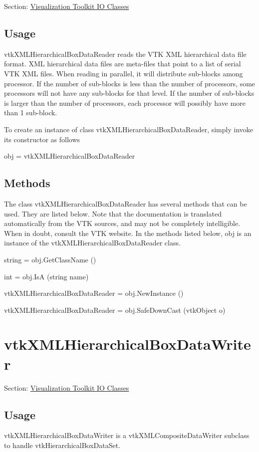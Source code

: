 Section\-: \hyperlink{sec_vtkio}{Visualization Toolkit I\-O Classes} \hypertarget{vtkwidgets_vtkxyplotwidget_Usage}{}\subsection{Usage}\label{vtkwidgets_vtkxyplotwidget_Usage}
vtk\-X\-M\-L\-Hierarchical\-Box\-Data\-Reader reads the V\-T\-K X\-M\-L hierarchical data file format. X\-M\-L hierarchical data files are meta-\/files that point to a list of serial V\-T\-K X\-M\-L files. When reading in parallel, it will distribute sub-\/blocks among processor. If the number of sub-\/blocks is less than the number of processors, some processors will not have any sub-\/blocks for that level. If the number of sub-\/blocks is larger than the number of processors, each processor will possibly have more than 1 sub-\/block.

To create an instance of class vtk\-X\-M\-L\-Hierarchical\-Box\-Data\-Reader, simply invoke its constructor as follows \begin{DoxyVerb}  obj = vtkXMLHierarchicalBoxDataReader
\end{DoxyVerb}
 \hypertarget{vtkwidgets_vtkxyplotwidget_Methods}{}\subsection{Methods}\label{vtkwidgets_vtkxyplotwidget_Methods}
The class vtk\-X\-M\-L\-Hierarchical\-Box\-Data\-Reader has several methods that can be used. They are listed below. Note that the documentation is translated automatically from the V\-T\-K sources, and may not be completely intelligible. When in doubt, consult the V\-T\-K website. In the methods listed below, {\ttfamily obj} is an instance of the vtk\-X\-M\-L\-Hierarchical\-Box\-Data\-Reader class. 
\begin{DoxyItemize}
\item {\ttfamily string = obj.\-Get\-Class\-Name ()}  
\item {\ttfamily int = obj.\-Is\-A (string name)}  
\item {\ttfamily vtk\-X\-M\-L\-Hierarchical\-Box\-Data\-Reader = obj.\-New\-Instance ()}  
\item {\ttfamily vtk\-X\-M\-L\-Hierarchical\-Box\-Data\-Reader = obj.\-Safe\-Down\-Cast (vtk\-Object o)}  
\end{DoxyItemize}\hypertarget{vtkio_vtkxmlhierarchicalboxdatawriter}{}\section{vtk\-X\-M\-L\-Hierarchical\-Box\-Data\-Writer}\label{vtkio_vtkxmlhierarchicalboxdatawriter}
Section\-: \hyperlink{sec_vtkio}{Visualization Toolkit I\-O Classes} \hypertarget{vtkwidgets_vtkxyplotwidget_Usage}{}\subsection{Usage}\label{vtkwidgets_vtkxyplotwidget_Usage}
vtk\-X\-M\-L\-Hierarchical\-Box\-Data\-Writer is a vtk\-X\-M\-L\-Composite\-Data\-Writer subclass to handle vtk\-Hierarchical\-Box\-Data\-Set.

